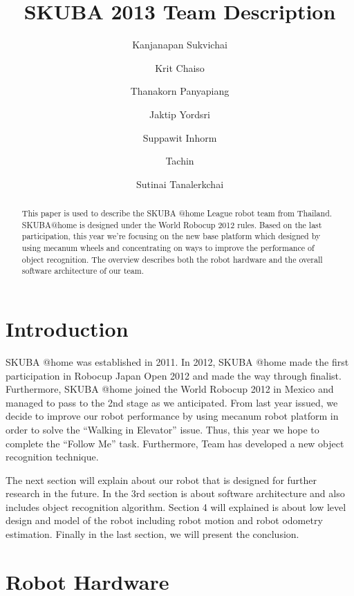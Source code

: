 \documentclass{llncs}
\newcommand{\dq}[1]{``#1''}
\begin{document}
\title{SKUBA 2013 Team Description}
\author{Kanjanapan Sukvichai
\and Krit Chaiso
\and Thanakorn Panyapiang
\and Jaktip Yordsri
\and Suppawit Inhorm
\and Tachin 
\and Sutinai Tanalerkchai
}


\maketitle

\begin{abstract}
This paper is used to describe the SKUBA @home League robot team from Thailand.
SKUBA@home is designed under the World Robocup 2012 rules. 
Based on the last participation, this year we're focusing on the new base platform which designed by using mecanum wheels and concentrating on ways to improve the performance of object recognition.
The overview describes both the robot hardware and the overall software architecture of our team.
\end{abstract}

\section{Introduction}
SKUBA @home was established in 2011. In 2012, SKUBA @home made the first participation in Robocup Japan Open 2012 and made the way through finalist. Furthermore, SKUBA @home joined the World Robocup 2012 in Mexico and managed to pass to the 2nd stage as we anticipated. From last year issued, we decide to improve our robot performance by using mecanum robot platform in order to solve the \dq{Walking in Elevator} issue. Thus, this year we hope to complete the \dq{Follow Me} task. Furthermore, Team has developed a new object recognition technique.

The next section will explain about our robot that is designed for further research in the future. In the 3rd section is about software architecture and also includes object recognition algorithm. Section 4 will explained is about low level design and model of the robot including robot motion and robot odometry estimation. Finally in the last section, we will present the conclusion.

\section{Robot Hardware}
\end{document}
